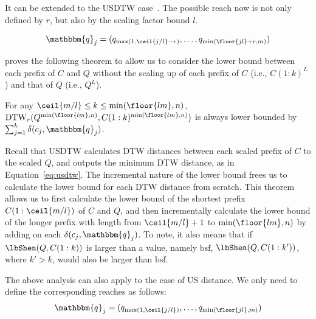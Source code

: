 It can be extended to the USDTW case~\cite{shen2017searching, shen2018accelerating}.
The possible reach now is not only defined by $r$, but also by the scaling factor bound $l$.

\begin{equation}
    \label{eq:lb_shen-usdtw-q}
    \mathbbm{q}_j = (q_{\max(1, \ceil{j/l} - r)}, \ldots, q_{\min(\floor{jl} + r, m)})
\end{equation}

\cite{shen2017searching} proves the following theorem to allow us to consider the lower bound between each prefix of $C$ and $Q$ without the scaling up of each prefix of $C$ (i.e., $C(1:k)^L$) and that of $Q$ (i.e., $Q^L$).

\begin{theorem}[] 
\label{thm:lb_shen}
    For any $\ceil{m/l} \leq k \leq \min(\floor{lm}, n)$, 
    $\operatorname{DTW}_r(Q^{\min(\floor{lm},n)}, C(1:k)^{\min(\floor{lm},n)})$ is always lower bounded by $\sum_{j=1}^k \delta(c_j, \mathbbm{q}_j)$.
\end{theorem}

Recall that USDTW calculates DTW distances between each scaled prefix of $C$ to the scaled $Q$, and outputs the minimum DTW distance, as in Equation~\ref{eq:usdtw}.
The incremental nature of the lower bound frees us to calculate the lower bound for each DTW distance from scratch.
This theorem allows us to first calculate the lower bound of the shortest prefix $C(1:\ceil{m/l})$ of $C$ and $Q$, and then incrementally calculate the lower bound of the longer prefix with length from $\ceil{m/l} + 1$ to $\min(\floor{lm}, n)$ by adding on each $\delta(c_j, \mathbbm{q}_j)$.
To note, it also means that if $\lbShen(Q, C(1:k))$ is larger than a value, namely $\mathrm{bsf}$, $\lbShen(Q, C(1:k'))$, where $k' > k$, would also be larger than $\mathrm{bsf}$.
%

The above analysis can also apply to the case of US distance.
We only need to define the corresponding reaches as follows: 
\begin{equation}
    \label{eq:lb_shen-us-q}
    \mathbbm{q}_j = (q_{\max(1, \ceil{j/l})}, \ldots, q_{\min(\floor{jl}, m)})
\end{equation}
